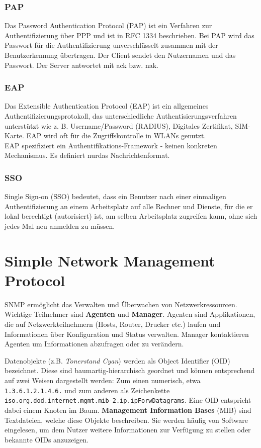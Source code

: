 \documentclass{article} %
\begin{document}
\subsubsection{PAP}
Das Password Authentication Protocol (PAP) ist ein Verfahren zur Authentifizierung über PPP und ist in RFC 1334 beschrieben. %
Bei PAP wird das Passwort für die Authentifizierung unverschlüsselt zusammen mit der Benutzerkennung übertragen. Der Client sendet den Nutzernamen und das Passwort. Der Server antwortet mit ack bzw. nak.

\subsubsection{EAP}
Das Extensible Authentication Protocol (EAP) ist ein  allgemeines Authentifizierungsprotokoll, das unterschiedliche Authentisierungsverfahren unterstützt wie z. B. Username/Password (RADIUS), Digitales Zertifikat, SIM-Karte. EAP wird oft für die Zugriffskontrolle in WLANs genutzt.\\
EAP spezifiziert ein Authentifikations-Framework - keinen konkreten Mechanismus. Es definiert \glqq nur\grqq das Nachrichtenformat.

\subsubsection{SSO}
Single Sign-on (SSO) bedeutet, dass ein Benutzer nach einer einmaligen Authentifizierung an einem Arbeitsplatz auf alle Rechner und Dienste, für die er lokal berechtigt (autorisiert) ist, am selben Arbeitsplatz zugreifen kann, ohne sich jedes Mal neu anmelden zu müssen. 

\section{Simple Network Management Protocol}


SNMP ermöglicht das Verwalten und Überwachen von Netzwerkressourcen.
Wichtige Teilnehmer sind \textbf{Agenten} und \textbf{Manager}.
Agenten sind Applikationen, die auf Netzwerkteilnehmern (Hosts, Router, Drucker etc.) laufen und Informationen über Konfiguration und Status verwalten.
Manager kontaktieren Agenten um Informationen abzufragen oder zu verändern.

Datenobjekte (z.B. \emph{Tonerstand Cyan}) werden als Object Identifier (OID) bezeichnet.
Diese sind baumartig-hierarchisch geordnet und können entsprechend auf zwei Weisen dargestellt werden:
Zum einen numerisch, etwa \texttt{1.3.6.1.2.1.4.6.} und zum anderen als Zeichenkette \texttt{iso.org.dod.internet.mgmt.mib-2.ip.ipForwDatagrams}.
Eine OID entspricht dabei einem Knoten im Baum.
\textbf{Management Information Bases} (MIB) sind Textdateien, welche diese Objekte beschreiben.
Sie werden häufig von Software eingelesen, um dem Nutzer weitere Informationen zur Verfügung zu stellen oder bekannte OIDs anzuzeigen.
\end{document}

